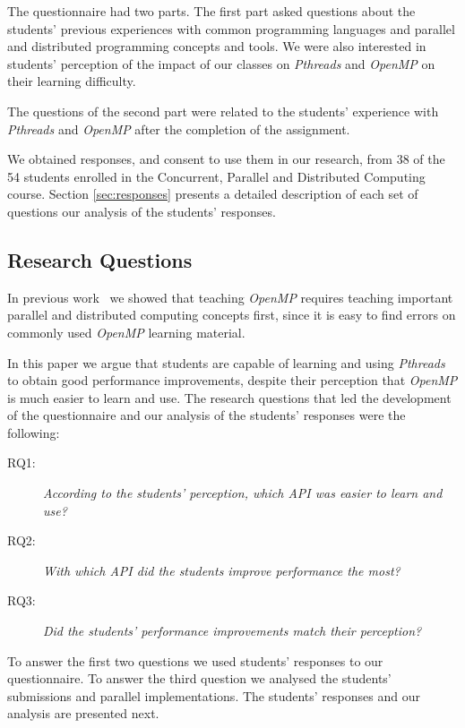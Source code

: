 The questionnaire had two parts. The first part asked questions
about the students' previous experiences with common programming languages and
parallel and distributed programming concepts and tools. We were also
interested in students' perception of the impact of our classes on
\textit{Pthreads} and \textit{OpenMP} on their learning difficulty.

The questions of the second part were related to the students'
experience with \textit{Pthreads} and \textit{OpenMP} after
the completion of the assignment.

We obtained responses, and consent to use them in our research, from 38 of the
54 students enrolled in the Concurrent, Parallel and Distributed Computing
course. Section \ref{sec:responses} presents a detailed description of each set
of questions our analysis of the students' responses.

\subsection{Research Questions}
\label{sec:resques}

In previous work~\cite{goncalves:OpenMPNotEasy} we showed that
teaching \textit{OpenMP} requires teaching important parallel
and distributed computing concepts first, since it is easy
to find errors on commonly used \textit{OpenMP} learning material.

In this paper we argue that students are capable of learning and using
\textit{Pthreads} to obtain good performance improvements, despite their
perception that \textit{OpenMP} is much easier to learn and use.
The research questions that led the development of the questionnaire
and our analysis of the students' responses were the following:

\begin{description}
    \item[RQ1:] \textit{According to the students' perception, which API was
        easier to learn and use?}
    \item[RQ2:] \textit{With which API did the students improve performance the
        most?}
    \item[RQ3:] \textit{Did the students' performance improvements match their
        perception?}
\end{description}

To answer the first two questions we used students' responses to
our questionnaire. To answer the third question we analysed the
students' submissions and parallel implementations. The
students' responses and our analysis are presented next.

